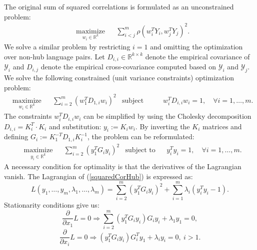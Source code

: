 \documentclass[twoside,11pt]{article}
\newcommand{\RR}{\mathbb{R}}
\begin{document}
The original sum of squared correlations is formulated as an unconstrained problem:
\begin{equation*}
  \begin{aligned}
    & \underset{w_i \in \RR^{k}}{\text{maximize}}
    & & \sum_{i < j}^m  \rho(w_i^T Y_i, w_j^T Y_j)^2.
\end{aligned}
\end{equation*}
We solve a similar problem by restricting $i=1$ and omitting the optimization over non-hub language pairs.
Let $D_{i,i} \in \RR^{k \times k}$ denote the empirical covariance of $\mathcal{Y}_i$ and $D_{i,j}$ denote the empirical cross-covariance computed based on $\mathcal{Y}_i$ and $\mathcal{Y}_j$. We solve the following constrained (unit variance constraints) optimization problem:
\begin{equation}\label{squaredCorHubOriginal}
  \begin{aligned}
    & \underset{w_i \in \RR^{k}}{\text{maximize}}
    & & \sum_{i = 2}^m  \left(w_1^T D_{1,i} w_i \right)^2
    & \text{subject to}
    & & w_i^T D_{i,i} w_i = 1, \quad\forall i = 1,\ldots, m.
\end{aligned}
\end{equation}
The constraints $w_i^T D_{i,i} w_i$ can be simplified by using the Cholesky decomposition $D_{i,i} = K_i^T \cdot K_i$ and substitution: $y_i := K_i w_i$. By inverting the $K_i$ matrices and defining  $G_i := K_1^{-T} D_{1,i} K_i^{-1}$, the problem can be reformulated:
\begin{equation}\label{squaredCorHub}
  \begin{aligned}
    & \underset{y_i \in \RR^{k}}{\text{maximize}}
    & & \sum_{i = 2}^m  \left(y_1^T G_{i} y_i \right)^2
    & \text{subject to}
    & & y_i^T y_i = 1, \quad\forall i = 1,\ldots, m.
\end{aligned}
\end{equation}
A necessary condition for optimality is that the derivatives of the Lagrangian vanish. The Lagrangian of (\ref{squaredCorHub}) is expressed as:
$$  L(y_1, \ldots, y_m, \lambda_1, \ldots, \lambda_m) = \sum_{i = 2}^m  \left(y_1^T G_{i} y_i \right)^2 + \sum_{i=1}^m \lambda_i \left(y_i^T y_i - 1\right).$$
Stationarity conditions give us:
\begin{equation}\label{dLdx1}
 \frac{\partial}{\partial x_1} L = 0 \Rightarrow \sum_{i = 2}^m  \left(y_1^T G_{i} y_i \right) G_i y_i + \lambda_1 y_1 = 0,
\end{equation}
\begin{equation}\label{dLdxi}
\frac{\partial}{\partial x_i} L = 0 \Rightarrow \left(y_1^T G_{i} y_i \right) G_{i}^T y_1 + \lambda_i y_i = 0,~i > 1.
\end{equation}
\end{document}
